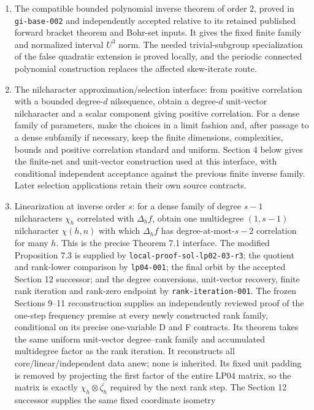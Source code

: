 \documentclass[11pt]{article}
\begin{document}
\begin{enumerate}
\item The compatible bounded polynomial inverse theorem of order $2$,
proved in \texttt{gi-base-002} and independently accepted relative to
its retained published forward bracket theorem and Bohr-set inputs.
It gives the fixed finite family and normalized interval $U^3$ norm.
The needed trivial-subgroup specialization of the false quadratic
extension is proved locally, and the periodic connected polynomial
construction replaces the affected skew-iterate route.
\item The nilcharacter approximation/selection interface: from positive
correlation with a bounded degree-$d$ nilsequence, obtain a degree-$d$
unit-vector nilcharacter and a scalar component giving positive correlation.
For a dense family of parameters, make the choices in a limit fashion and,
after passage to a dense subfamily if necessary, keep the finite dimensions,
complexities, bounds and positive correlation standard and uniform.
Section 4 below gives the finite-net and unit-vector construction used
at this interface, with conditional independent acceptance against the
previous finite inverse family. Later selection applications retain
their own source contracts.
\item Linearization at inverse order $s$: for a dense family of degree
$s-1$ nilcharacters $\chi_h$ correlated with $\Delta_hf$, obtain one
multidegree $(1,s-1)$ nilcharacter $\chi(h,n)$ with which $\Delta_h f$
has degree-at-most-$s-2$ correlation for many $h$.
This is the precise Theorem 7.1 interface. The modified Proposition 7.3
is supplied by \texttt{local-proof-sol-lp02-03-r3}; the quotient and
rank-lower comparison by \texttt{lp04-001}; the final orbit by the
accepted Section 12 successor; and the degree conversions, unit-vector
recovery, finite rank iteration and rank-zero endpoint by
\texttt{rank-iteration-001}. The frozen Sections 9--11 reconstruction
supplies an independently reviewed proof of the one-step frequency premise at
every newly constructed rank family, conditional on its precise
one-variable D and F contracts. Its theorem takes the same uniform
unit-vector degree--rank family and accumulated multidegree factor as
the rank iteration. It reconstructs all core/linear/independent data
anew; none is inherited. Its fixed unit padding is removed by projecting
the first factor of the entire LP04 matrix, so the matrix is exactly
$\chi_h\otimes\overline{\zeta_h}$ required by the next rank step.
The Section 12 successor supplies the same fixed coordinate isometry

\end{enumerate}
\end{document}
